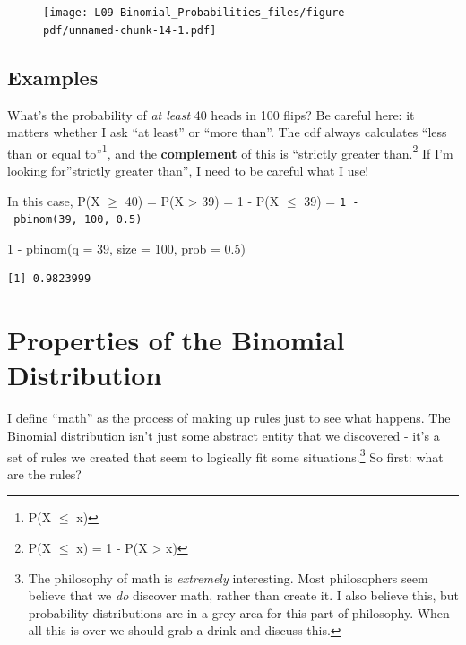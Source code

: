 \documentclass[
  letterpaper,
  DIV=11,
  numbers=noendperiod]{scrreprt}
\newenvironment{Shaded}{\begin{snugshade}}{\end{snugshade}}
\newcommand{\AttributeTok}[1]{\textcolor[rgb]{0.40,0.45,0.13}{#1}}
\newcommand{\DecValTok}[1]{\textcolor[rgb]{0.68,0.00,0.00}{#1}}
\newcommand{\FloatTok}[1]{\textcolor[rgb]{0.68,0.00,0.00}{#1}}
\newcommand{\FunctionTok}[1]{\textcolor[rgb]{0.28,0.35,0.67}{#1}}
\newcommand{\NormalTok}[1]{\textcolor[rgb]{0.00,0.23,0.31}{#1}}
\newcommand{\SpecialCharTok}[1]{\textcolor[rgb]{0.37,0.37,0.37}{#1}}
\begin{document}
\begin{figure}[H]

{\centering \texttt{[image: L09-Binomial\_Probabilities\_files/figure-pdf/unnamed-chunk-14-1.pdf]}

}

\end{figure}

\hypertarget{examples-3}{%
\section{Examples}\label{examples-3}}

What's the probability of \emph{at least} 40 heads in 100 flips? Be
careful here: it matters whether I ask ``at least'' or ``more than''.
The cdf always calculates ``less than or equal to''\footnote{P(X \(\le\)
  x)}, and the \textbf{complement} of this is ``strictly greater
than.\footnote{P(X \(\le\) x) = 1 - P(X \textgreater{} x)} If I'm
looking for''strictly greater than'', I need to be careful what I use!

In this case, P(X \(\ge\) 40) = P(X \textgreater{} 39) = 1 - P(X \(\le\)
39) = \texttt{1\ -\ pbinom(39,\ 100,\ 0.5)}

\begin{Shaded}
\begin{Highlighting}[]
\DecValTok{1} \SpecialCharTok{{-}} \FunctionTok{pbinom}\NormalTok{(}\AttributeTok{q =} \DecValTok{39}\NormalTok{, }\AttributeTok{size =} \DecValTok{100}\NormalTok{, }\AttributeTok{prob =} \FloatTok{0.5}\NormalTok{)}
\end{Highlighting}
\end{Shaded}

\begin{verbatim}
[1] 0.9823999
\end{verbatim}

\hypertarget{properties-of-the-binomial-distribution}{%
\chapter{Properties of the Binomial
Distribution}\label{properties-of-the-binomial-distribution}}

I define ``math'' as the process of making up rules just to see what
happens. The Binomial distribution isn't just some abstract entity that
we discovered - it's a set of rules we created that seem to logically
fit some situations.\footnote{The philosophy of math is \emph{extremely}
  interesting. Most philosophers seem believe that we \emph{do} discover
  math, rather than create it. I also believe this, but probability
  distributions are in a grey area for this part of philosophy. When all
  this is over we should grab a drink and discuss this.} So first: what
are the rules?
\end{document}
